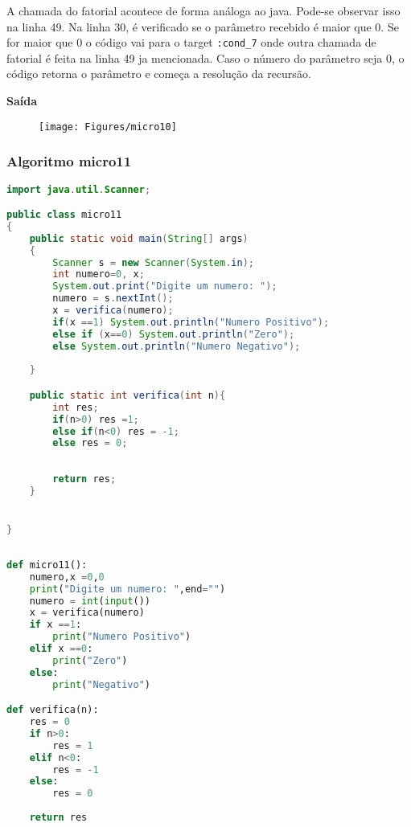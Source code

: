 \documentclass[hidelinks,12pt]{article}
\begin{document}
	A chamada do fatorial acontece de forma análoga ao java. Pode-se observar isso na linha 49. Na linha 30, é verificado se o parâmetro recebido é maior que 0. Se for maior que 0 o código vai para o target \texttt{:cond\_7} onde outra chamada de fatorial é feita na linha 49 ja mencionada. Caso o número do parâmetro seja 0, o código retorna o parâmetro e começa a resolução da recursão.
	
	{\large{\textbf{Saída}}}
	
	\begin{figure}[!h]
		\centering
		\texttt{[image: Figures/micro10]}
	\end{figure}
	
	\subsubsection{Algoritmo micro11}
	
	\begin{lstlisting}[caption=Código em Java,language=java]
import java.util.Scanner;

public class micro11
{
	public static void main(String[] args)
	{
		Scanner s = new Scanner(System.in);
		int numero=0, x;
		System.out.print("Digite um numero: ");
		numero = s.nextInt();
		x = verifica(numero);
		if(x ==1) System.out.println("Numero Positivo");
		else if (x==0) System.out.println("Zero");
		else System.out.println("Numero Negativo");
	
	}

	public static int verifica(int n){
		int res;
		if(n>0) res =1;
		else if(n<0) res = -1;
		else res = 0;
		
		
		return res;
	}


}	
	
	\end{lstlisting}
	
	\begin{lstlisting}[caption=Código em python,language=Python]
def micro11():
	numero,x =0,0
	print("Digite um numero: ",end="")
	numero = int(input())
	x = verifica(numero)
	if x ==1:
		print("Numero Positivo")
	elif x ==0:
		print("Zero")
	else:
		print("Negativo")

def verifica(n):
	res = 0
	if n>0:
		res = 1
	elif n<0:
		res = -1
	else:
		res = 0
	
	return res	
	
	\end{lstlisting}
	
\end{document}
